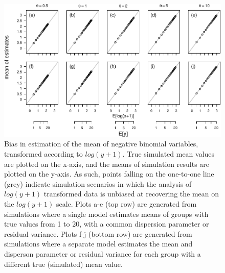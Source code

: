 \documentclass[]{article}
\begin{document}
\begin{figure}[h]

{\centering \includegraphics{revisiting_count_data_advice_files/figure-latex/biasLogPlusOne-1} 

}

\caption{Bias in estimation of the mean of negative binomial variables, transformed according to $log(y+1)$.  True simulated mean values are plotted on the x-axis, and the means of simulation results are plotted on the y-axis.  As such, points falling on the one-to-one line (grey) indicate simulation scenarios in which the analysis of $log(y+1)$ transformed data is unbiased at recovering the mean on the $log(y+1)$ scale. Plots a-e (top row) are generated from simulations where a single model estimates means of groups with true values from 1 to 20, with a common dispersion parameter or residual variance. Plots f-j (bottom row) are generated from simulations where a separate model estimates the mean and disperson parameter or residual variance for each group with a different true (simulated) mean value.}\label{fig:biasLogPlusOne}
\end{figure}
\end{document}
